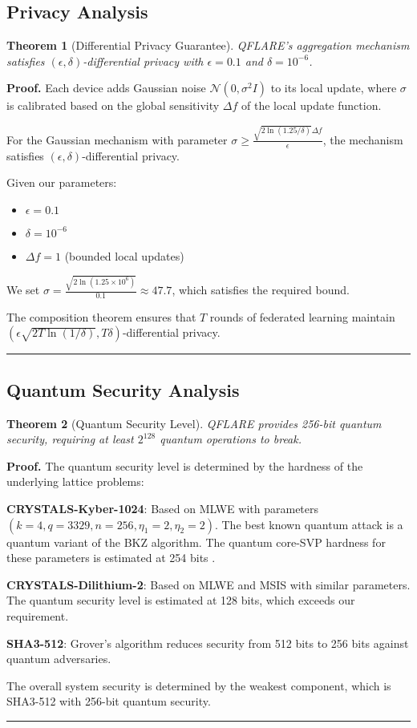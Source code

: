 \documentclass[journal,onecolumn]{IEEEtran}
\newtheorem{theorem}{Theorem}
\newenvironment{proof}[1][Proof]{\noindent\textbf{#1.} }{\ \rule{0.5em}{0.5em}}
\begin{document}
\subsection{Privacy Analysis}

\begin{theorem}[Differential Privacy Guarantee]
QFLARE's aggregation mechanism satisfies $(\epsilon, \delta)$-differential privacy with $\epsilon = 0.1$ and $\delta = 10^{-6}$.
\end{theorem}

\begin{proof}
Each device adds Gaussian noise $\mathcal{N}(0, \sigma^2 I)$ to its local update, where $\sigma$ is calibrated based on the global sensitivity $\Delta f$ of the local update function.

For the Gaussian mechanism with parameter $\sigma \geq \frac{\sqrt{2\ln(1.25/\delta)}\Delta f}{\epsilon}$, the mechanism satisfies $(\epsilon, \delta)$-differential privacy.

Given our parameters:
\begin{itemize}
\item $\epsilon = 0.1$
\item $\delta = 10^{-6}$  
\item $\Delta f = 1$ (bounded local updates)
\end{itemize}

We set $\sigma = \frac{\sqrt{2\ln(1.25 \times 10^6)}}{0.1} \approx 47.7$, which satisfies the required bound.

The composition theorem ensures that $T$ rounds of federated learning maintain $(\epsilon \sqrt{2T\ln(1/\delta)}, T\delta)$-differential privacy.
\end{proof}

\subsection{Quantum Security Analysis}

\begin{theorem}[Quantum Security Level]
QFLARE provides 256-bit quantum security, requiring at least $2^{128}$ quantum operations to break.
\end{theorem}

\begin{proof}
The quantum security level is determined by the hardness of the underlying lattice problems:

\textbf{CRYSTALS-Kyber-1024}: Based on MLWE with parameters $(k=4, q=3329, n=256, \eta_1=2, \eta_2=2)$. The best known quantum attack is a quantum variant of the BKZ algorithm. The quantum core-SVP hardness for these parameters is estimated at 254 bits \cite{alkim2016post}.

\textbf{CRYSTALS-Dilithium-2}: Based on MLWE and MSIS with similar parameters. The quantum security level is estimated at 128 bits, which exceeds our requirement.

\textbf{SHA3-512}: Grover's algorithm reduces security from 512 bits to 256 bits against quantum adversaries.

The overall system security is determined by the weakest component, which is SHA3-512 with 256-bit quantum security.
\end{proof}
\end{document}
